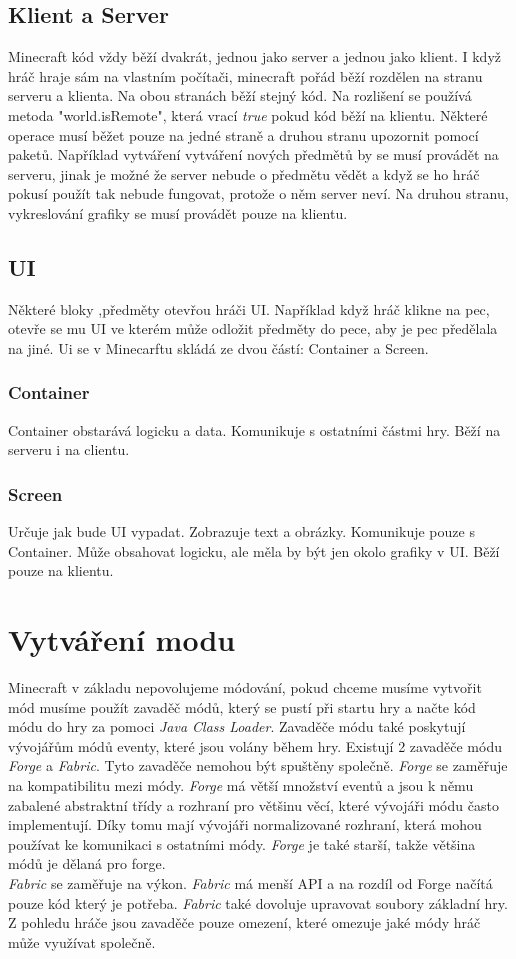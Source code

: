 \documentclass[FM,RP]{tulthesis}
\begin{document}
\section{Klient a Server}
Minecraft kód vždy běží dvakrát, jednou jako server a jednou jako klient. I když hráč hraje sám na vlastním počítači, minecraft pořád běží rozdělen na stranu serveru a klienta. Na obou stranách běží stejný kód. Na rozlišení se používá metoda "world.isRemote", která vrací \textit{true} pokud kód běží na klientu. Některé operace musí běžet pouze na jedné straně a druhou stranu upozornit pomocí paketů. Například vytváření vytváření nových předmětů by se musí provádět na serveru, jinak je možné že server nebude o předmětu vědět a když se ho hráč pokusí použít tak nebude fungovat, protože o něm server neví. Na druhou stranu, vykreslování grafiky se musí provádět pouze na klientu. 
\section{UI}
Některé bloky ,předměty otevřou hráči UI. Například když hráč klikne na pec, otevře se mu UI ve kterém může odložit předměty do pece, aby je pec předělala na jiné. Ui se v Minecarftu skládá ze dvou částí: Container a Screen.
\subsection{Container}
Container obstarává logicku a data. Komunikuje s ostatními částmi hry. Běží na serveru i na  clientu.
\subsection{Screen}
Určuje jak bude UI vypadat. Zobrazuje text a obrázky. Komunikuje pouze s Container. Může obsahovat logicku, ale měla by být jen okolo grafiky v UI. Běží pouze na klientu.

\chapter{Vytváření modu}
Minecraft v základu nepovolujeme módování, pokud chceme musíme vytvořit mód musíme použít zavaděč módů, který se pustí při startu hry a načte kód módu do hry za pomoci \textit{Java Class Loader}. Zavaděče módu také poskytují vývojářům módů eventy, které jsou volány během hry. Existují 2 zavaděče módu \textit{Forge} a \textit{Fabric}. Tyto zavaděče nemohou být spuštěny společně.
\textit{Forge} se zaměřuje na kompatibilitu mezi módy. \textit{Forge} má větší množství eventů a jsou k němu zabalené abstraktní třídy a rozhraní pro většinu věcí, které vývojáři módu často implementují. Díky tomu mají vývojáři normalizované rozhraní, která mohou používat ke komunikaci s ostatními módy. \textit{Forge} je také starší, takže většina módů je dělaná pro forge.\\
\textit{Fabric} se zaměřuje na výkon. \textit{Fabric} má menší API a na rozdíl od Forge načítá pouze kód který je potřeba. \textit{Fabric} také dovoluje upravovat soubory základní hry.\\
Z pohledu hráče jsou zavaděče pouze omezení, které omezuje jaké módy hráč může využívat společně.
\end{document}
